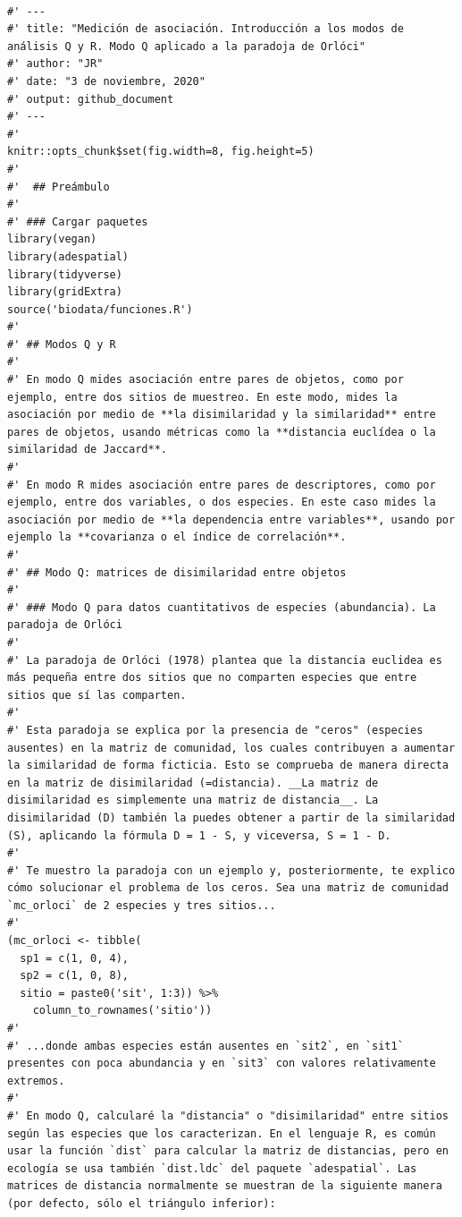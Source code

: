 \documentclass[11pt,]{article}
\begin{document}
\begin{verbatim}

#' ---
#' title: "Medición de asociación. Introducción a los modos de análisis Q y R. Modo Q aplicado a la paradoja de Orlóci"
#' author: "JR"
#' date: "3 de noviembre, 2020"
#' output: github_document
#' ---
#'
knitr::opts_chunk$set(fig.width=8, fig.height=5)
#'
#'  ## Preámbulo
#'  
#' ### Cargar paquetes
library(vegan)
library(adespatial)
library(tidyverse)
library(gridExtra)
source('biodata/funciones.R')
#' 
#' ## Modos Q y R
#' 
#' En modo Q mides asociación entre pares de objetos, como por ejemplo, entre dos sitios de muestreo. En este modo, mides la asociación por medio de **la disimilaridad y la similaridad** entre pares de objetos, usando métricas como la **distancia euclídea o la similaridad de Jaccard**.
#' 
#' En modo R mides asociación entre pares de descriptores, como por ejemplo, entre dos variables, o dos especies. En este caso mides la asociación por medio de **la dependencia entre variables**, usando por ejemplo la **covarianza o el índice de correlación**.
#' 
#' ## Modo Q: matrices de disimilaridad entre objetos
#' 
#' ### Modo Q para datos cuantitativos de especies (abundancia). La paradoja de Orlóci
#' 
#' La paradoja de Orlóci (1978) plantea que la distancia euclidea es más pequeña entre dos sitios que no comparten especies que entre sitios que sí las comparten.
#' 
#' Esta paradoja se explica por la presencia de "ceros" (especies ausentes) en la matriz de comunidad, los cuales contribuyen a aumentar la similaridad de forma ficticia. Esto se comprueba de manera directa en la matriz de disimilaridad (=distancia). __La matriz de disimilaridad es simplemente una matriz de distancia__. La disimilaridad (D) también la puedes obtener a partir de la similaridad (S), aplicando la fórmula D = 1 - S, y viceversa, S = 1 - D.
#'
#' Te muestro la paradoja con un ejemplo y, posteriormente, te explico cómo solucionar el problema de los ceros. Sea una matriz de comunidad `mc_orloci` de 2 especies y tres sitios...
#' 
(mc_orloci <- tibble(
  sp1 = c(1, 0, 4),
  sp2 = c(1, 0, 8),
  sitio = paste0('sit', 1:3)) %>% 
    column_to_rownames('sitio'))
#' 
#' ...donde ambas especies están ausentes en `sit2`, en `sit1` presentes con poca abundancia y en `sit3` con valores relativamente extremos.
#' 
#' En modo Q, calcularé la "distancia" o "disimilaridad" entre sitios según las especies que los caracterizan. En el lenguaje R, es común usar la función `dist` para calcular la matriz de distancias, pero en ecología se usa también `dist.ldc` del paquete `adespatial`. Las matrices de distancia normalmente se muestran de la siguiente manera (por defecto, sólo el triángulo inferior):

\end{verbatim}
\end{document}
